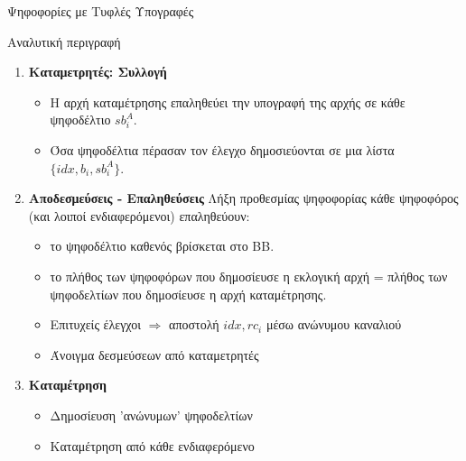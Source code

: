 \documentclass[handout]{beamer}
\begin{document}
\begin{section}{Ψηφοφορίες με Τυφλές Υπογραφές}
\begin{frame}[allowframebreaks]{Αναλυτική περιγραφή}
\begin{enumerate}
\framebreak

\item \textbf{Καταμετρητές: Συλλογή}
\begin{itemize}
\item Η αρχή καταμέτρησης επαληθεύει την υπογραφή της αρχής σε κάθε ψηφοδέλτιο $sb_i^A$.
\item Όσα ψηφοδέλτια πέρασαν τον έλεγχο δημοσιεύονται σε μια λίστα $\{ idx, b_i, sb_i^A \}$.
\end{itemize}

\framebreak

\item \textbf{Αποδεσμεύσεις - Επαληθεύσεις}
Λήξη προθεσμίας ψηφοφορίας κάθε ψηφοφόρος (και λοιποί ενδιαφερόμενοι) επαληθεύουν:

\begin{itemize}
\item το ψηφοδέλτιο καθενός βρίσκεται στο BB.
\item το πλήθος των ψηφοφόρων που δημοσίευσε η εκλογική αρχή =   πλήθος των ψηφοδελτίων που δημοσίευσε η αρχή καταμέτρησης. 
\item Επιτυχείς έλεγχοι $\Rightarrow$ αποστολή $idx,rc_i$ μέσω ανώνυμου καναλιού
\item Άνοιγμα δεσμεύσεων από καταμετρητές
\end{itemize}
  
\item \textbf{Καταμέτρηση}
\begin{itemize}
\item Δημοσίευση 'ανώνυμων' ψηφοδελτίων
\item Καταμέτρηση από κάθε ενδιαφερόμενο  
\end{itemize}
\end{enumerate}

\end{frame}
\end{section} 
 
\end{document}

